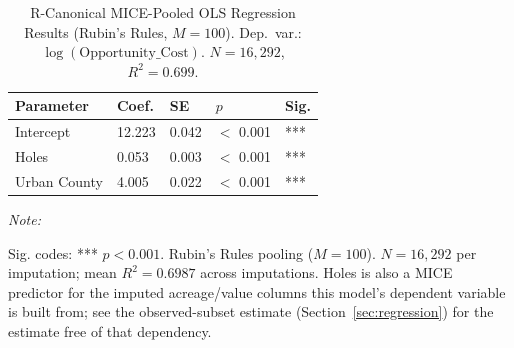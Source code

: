 \begin{table}[!h]
\centering
\caption{\label{tab:regression_results}R-Canonical MICE-Pooled OLS Regression Results (Rubin's Rules, $M = 100$). Dep.\ var.: $\log(\text{Opportunity\_Cost})$. $N = 16,292$, $R^2 = 0.699$.}
\centering
\fontsize{10}{12}\selectfont
\begin{threeparttable}
\begin{tabular}[t]{lllll}
\toprule
Parameter & Coef. & SE & $p$ & Sig.\\
\midrule
Intercept & 12.223 & 0.042 & $<$ 0.001 & ***\\
Holes & 0.053 & 0.003 & $<$ 0.001 & ***\\
Urban County & 4.005 & 0.022 & $<$ 0.001 & ***\\
\bottomrule
\end{tabular}
\begin{tablenotes}
\item \textit{Note: } 
\item Sig. codes: *** $p < 0.001$. Rubin's Rules pooling ($M = 100$). $N = 16,292$ per imputation; mean $R^2 = 0.6987$ across imputations. Holes is also a MICE predictor for the imputed acreage/value columns this model's dependent variable is built from; see the observed-subset estimate (Section~\ref{sec:regression}) for the estimate free of that dependency.
\end{tablenotes}
\end{threeparttable}
\end{table}
